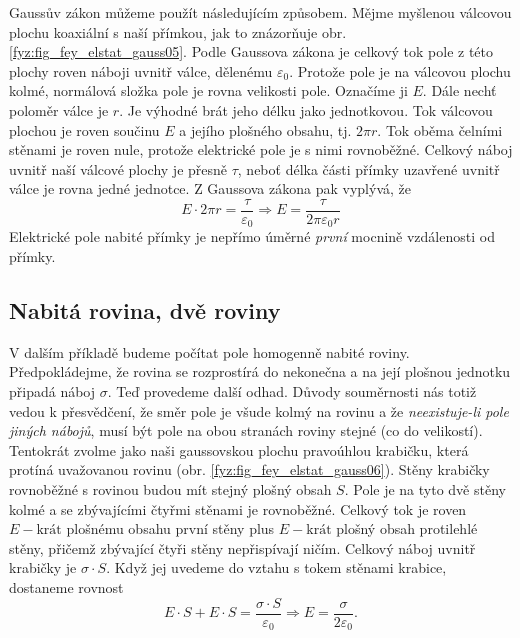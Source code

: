       Gaussův zákon můžeme použít následujícím způsobem. Mějme myšlenou válcovou plochu koaxiální s naší 
      přímkou, jak to znázorňuje obr. \ref{fyz:fig_fey_elstat_gauss05}. Podle Gaussova zákona je celkový tok 
      pole z této plochy roven náboji uvnitř válce, dělenému \(\varepsilon_0\). Protože pole je na válcovou 
      plochu kolmé, normálová složka pole je rovna velikosti pole. Označíme ji \(E\). Dále nechť poloměr 
      válce je \(r\). Je výhodné brát jeho délku jako jednotkovou. Tok válcovou plochou je roven součinu 
      \(E\) a jejího plošného obsahu, tj. \(2\pi r\). Tok oběma čelními stěnami je roven nule, protože 
      elektrické pole je s nimi rovnoběžné. Celkový náboj uvnitř naší válcové plochy je přesně \(\tau\), 
      neboť délka části přímky uzavřené uvnitř válce je rovna jedné jednotce. Z Gaussova zákona pak vyplývá, 
      že
      \begin{equation}\label{fyz:eq_fey_elstat_gauss02}
        E\cdot2\pi r = \frac{\tau}{\varepsilon_0} \Rightarrow E = \frac{\tau}{2\pi\varepsilon_0 r}
      \end{equation}
      Elektrické pole nabité přímky je nepřímo úměrné \emph{první} mocnině vzdálenosti od přímky.
    
    \subsection{Nabitá rovina, dvě roviny}
      V dalším příkladě budeme počítat pole homogenně nabité roviny. Předpokládejme, že rovina se rozprostírá 
      do nekonečna a na její plošnou jednotku připadá náboj \(\sigma\). Teď provedeme další odhad. Důvody 
      souměrnosti nás totiž vedou k přesvědčení, že směr pole je všude kolmý na rovinu a že 
      \emph{neexistuje-li pole jiných nábojů}, musí být pole na obou stranách roviny stejné (co do 
      velikostí). Tentokrát zvolme jako naši gaussovskou plochu pravoúhlou krabičku, která protíná uvažovanou 
      rovinu (obr. \ref{fyz:fig_fey_elstat_gauss06}). Stěny krabičky rovnoběžné s rovinou budou mít stejný 
      plošný obsah \(S\). Pole je na tyto dvě stěny kolmé a se zbývajícími čtyřmi stěnami je rovnoběžné. 
      Celkový tok je roven \(E-\text{krát}\) plošnému obsahu první stěny plus \(E-\text{krát}\) plošný obsah 
      protilehlé stěny, přičemž zbývající čtyři stěny nepřispívají ničím. Celkový náboj uvnitř krabičky je 
      \(\sigma\cdot S\). Když jej uvedeme do vztahu s tokem stěnami krabice, dostaneme rovnost
      \begin{equation}\label{fyz:eq_fey_elstat_gauss03}
        E\cdot S + E\cdot S = \frac{\sigma\cdot S}{\varepsilon_0} \Rightarrow 
        E = \frac{\sigma}{2\varepsilon_0}.
      \end{equation}
      
